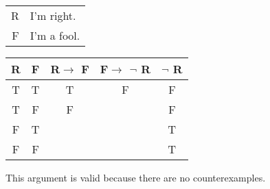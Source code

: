 \begin{tabular}{r l}
    R & I'm right. \\
    F & I'm a fool.
\end{tabular}

\begin{tabular}{c|c||c|c||c}
    R & F & R$\rightarrow$ F & F$\rightarrow$ $\lnot$ R & $\lnot$ R \\
    \hline
    T & T & T & F & F \\
    T & F & F &   & F \\
    F & T &   &   & T \\
    F & F &   &   & T
\end{tabular}

\noindent This argument is valid because there are no counterexamples.